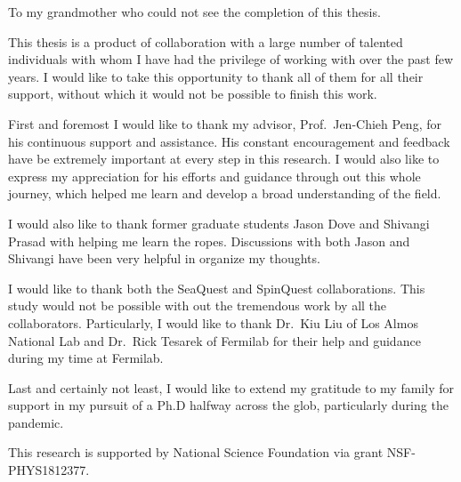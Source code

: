 \documentclass[../main.tex]{subfiles}
\begin{document}
\begin{dedication}
	To my grandmother who could not see the completion of this thesis.
\end{dedication}

\begin{acknowledgments}
	This thesis is a product of collaboration with a large number of talented
	individuals with whom I have had the privilege of working with over the past
	few years. I would like to take this opportunity to thank all of them for all
	their support, without which it would not be possible to finish this work.

	First and foremost I would like to thank my advisor, Prof.~Jen-Chieh Peng, for
	his continuous support and assistance. His constant encouragement and feedback
	have be extremely important at every step in this research.
	I would also like to express my	appreciation for his efforts and guidance
	through out this whole journey, which helped me learn and develop a broad
	understanding of the field.

	I would also like to thank former graduate students Jason Dove and Shivangi
	Prasad with helping me learn the ropes. Discussions with both Jason and
	Shivangi have been very helpful in organize my thoughts.

	I would like to thank both the SeaQuest and SpinQuest collaborations.
	This study would not be possible with out the tremendous work by all the
	collaborators. Particularly, I would like to thank Dr.~Kiu Liu of Los Almos
	National Lab and Dr.~Rick Tesarek of Fermilab for their help and guidance during
	my time at Fermilab.

	Last and certainly not least, I would like to extend my gratitude to my family
	for support in my pursuit of a Ph.D halfway across the glob, particularly
	during the pandemic.

	This research is supported by National Science Foundation via grant NSF-PHYS1812377.

\end{acknowledgments}
\end{document}
